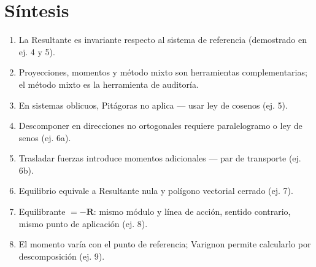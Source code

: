 \documentclass[
  spanish,
  11pt,
  a4paper,
]{article}
\providecommand{\tightlist}{%
  \setlength{\itemsep}{0pt}\setlength{\parskip}{0pt}}
\begin{document}
\section{Síntesis}\label{suxedntesis}

\begin{enumerate}
\def\labelenumi{\arabic{enumi}.}
\tightlist
\item
  La Resultante es invariante respecto al sistema de referencia
  (demostrado en ej. 4 y 5).
\item
  Proyecciones, momentos y método mixto son herramientas
  complementarias; el método mixto es la herramienta de auditoría.
\item
  En sistemas oblicuos, Pitágoras no aplica --- usar ley de cosenos (ej.
  5).
\item
  Descomponer en direcciones no ortogonales requiere paralelogramo o ley
  de senos (ej. 6a).
\item
  Trasladar fuerzas introduce momentos adicionales --- par de transporte
  (ej. 6b).
\item
  Equilibrio equivale a Resultante nula y polígono vectorial cerrado
  (ej. 7).
\item
  Equilibrante \(= -\mathbf{R}\): mismo módulo y línea de acción,
  sentido contrario, mismo punto de aplicación (ej. 8).
\item
  El momento varía con el punto de referencia; Varignon permite
  calcularlo por descomposición (ej. 9).
\end{enumerate}
\end{document}
